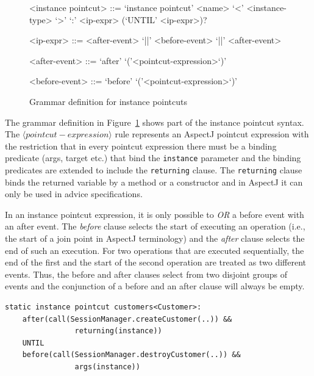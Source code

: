 \documentclass{acm_proc_article-sp}
\begin{document}
\begin{figure}[h!]
\begin{grammar}
<instance pointcut> ::= `instance pointcut' <name> `<' <instance-type> `>' `:'
<ip-expr> (`UNTIL' <ip-expr>)? 

<ip-expr> ::= <after-event> `||' <before-event>  `||' <after-event>  

<after-event> ::= `after' `('<pointcut-expression>`)'

<before-event> ::= `before' `('<pointcut-expression>`)'
\end{grammar}
\caption{Grammar definition for instance pointcuts}
\label{fig:grammar1}
\end{figure}

The grammar definition in Figure~\ref{fig:grammar1} shows part of the instance pointcut syntax. 
The $\langle pointcut-expression\rangle$ rule represents an AspectJ pointcut expression with the restriction that in every pointcut expression there must be a binding predicate (args, target etc.) that bind the \lstinline{instance} parameter and the binding predicates are extended to include the \lstinline{returning} clause. The \lstinline{returning} clause binds the returned variable by a method or a constructor and in AspectJ it can only be used in advice specifications. 

In an instance pointcut expression, it is only possible to \emph{OR} a before event with an after event. 
The \emph{before} clause selects the start of executing an operation (i.e., the start of a join point in AspectJ terminology) and the \emph{after} clause selects the end of such an execution. 
For two operations that are executed sequentially, the end of the first and the start of the second operation are treated as two different events. Thus, the before and after clauses select from two disjoint groups of events and the conjunction of a before and an after clause will always be empty.



\begin{lstlisting}[float=h!, caption={A basic instance pointcut declaration with add and remove expressions}, label={lst:basic}]
static instance pointcut customers<Customer>: 
	after(call(SessionManager.createCustomer(..)) && 
				returning(instance)) 
	UNTIL 
	before(call(SessionManager.destroyCustomer(..)) && 
				args(instance))
\end{lstlisting}
\end{document}
